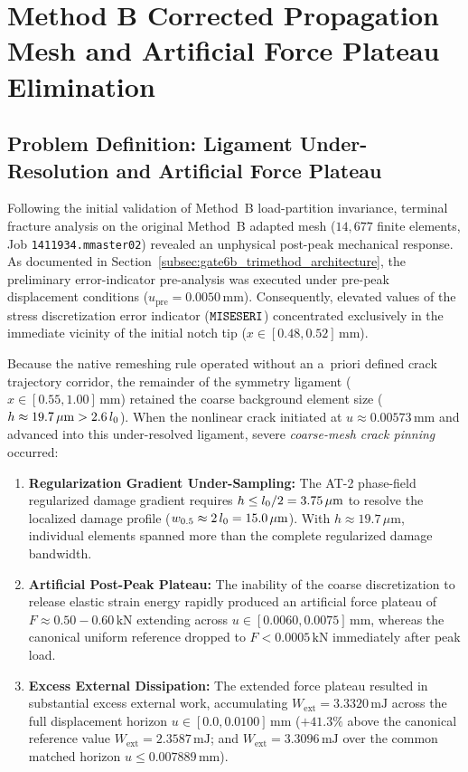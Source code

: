 \section{Method B Corrected Propagation Mesh and Artificial Force Plateau Elimination}
\label{sec:method_b_corrected_propagation}

\subsection{Problem Definition: Ligament Under-Resolution and Artificial Force Plateau}
\label{subsec:method_b_plateau_problem}

Following the initial validation of Method~B load-partition invariance, terminal fracture analysis on the original Method~B adapted mesh ($14{,}677$ finite elements, Job \texttt{1411934.mmaster02}) revealed an unphysical post-peak mechanical response. As documented in Section~\ref{subsec:gate6b_trimethod_architecture}, the preliminary error-indicator pre-analysis was executed under pre-peak displacement conditions ($u_{\mathrm{pre}} = 0.0050\,\mathrm{mm}$). Consequently, elevated values of the stress discretization error indicator ($\texttt{MISESERI}$) concentrated exclusively in the immediate vicinity of the initial notch tip ($x \in [0.48, 0.52]\,\mathrm{mm}$).

Because the native remeshing rule operated without an a~priori defined crack trajectory corridor, the remainder of the symmetry ligament ($x \in [0.55, 1.00]\,\mathrm{mm}$) retained the coarse background element size ($h \approx 19.7\,\mu\mathrm{m} > 2.6\,l_0$). When the nonlinear crack initiated at $u \approx 0.00573\,\mathrm{mm}$ and advanced into this under-resolved ligament, severe \emph{coarse-mesh crack pinning} occurred:
\begin{enumerate}
  \item \textbf{Regularization Gradient Under-Sampling:} The AT-2 phase-field regularized damage gradient requires $h \le l_0 / 2 = 3.75\,\mu\mathrm{m}$ to resolve the localized damage profile ($w_{0.5} \approx 2\,l_0 = 15.0\,\mu\mathrm{m}$). With $h \approx 19.7\,\mu\mathrm{m}$, individual elements spanned more than the complete regularized damage bandwidth.
  \item \textbf{Artificial Post-Peak Plateau:} The inability of the coarse discretization to release elastic strain energy rapidly produced an artificial force plateau of $F \approx 0.50 - 0.60\,\mathrm{kN}$ extending across $u \in [0.0060, 0.0075]\,\mathrm{mm}$, whereas the canonical uniform reference dropped to $F < 0.0005\,\mathrm{kN}$ immediately after peak load.
  \item \textbf{Excess External Dissipation:} The extended force plateau resulted in substantial excess external work, accumulating $W_{\mathrm{ext}} = 3.3320\,\mathrm{mJ}$ across the full displacement horizon $u \in [0.0, 0.0100]\,\mathrm{mm}$ ($+41.3\%$ above the canonical reference value $W_{\mathrm{ext}} = 2.3587\,\mathrm{mJ}$; and $W_{\mathrm{ext}} = 3.3096\,\mathrm{mJ}$ over the common matched horizon $u \le 0.007889\,\mathrm{mm}$).
\end{enumerate}

